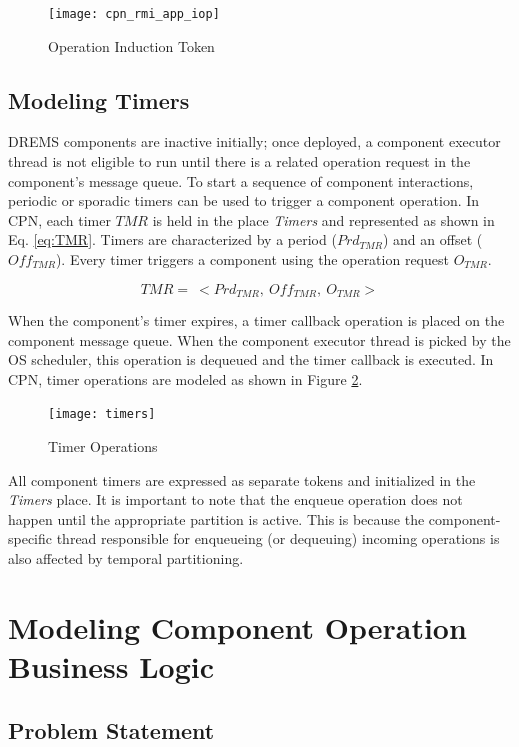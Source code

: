  \begin{figure}[h]
 	\centering
 	\texttt{[image: cpn\_rmi\_app\_iop]}
 	\caption{Operation Induction Token}
 	\label{fig:cpn_rmi_app_iop}
 \end{figure}

\subsection{Modeling Timers}

DREMS components are inactive initially; once deployed, a component executor thread is not eligible to run until there is a related operation request in the component's message queue. To start a sequence of component interactions, periodic or sporadic timers can be used to trigger a component operation. In CPN, each timer $TMR$ is held in the place \emph{Timers} and represented as shown in Eq. \ref{eq:TMR}. Timers are characterized by a period ($Prd_{TMR}$) and an offset ($Off_{TMR}$). Every timer triggers a component using the operation request $O_{TMR}$.

\begin{equation}
\label{eq:TMR}
TMR = \ < Prd_{TMR}, \ Off_{TMR}, \ O_{TMR}>
\end{equation} 

When the component's timer expires, a timer callback operation is placed on the component message queue. When the component executor thread is picked by the OS scheduler, this operation is dequeued and the timer callback is executed. In CPN, timer operations are modeled as shown in Figure \ref{fig:cpn_timers}. 

\begin{figure}[ht]
	\centering
	\texttt{[image: timers]}
	\caption{Timer Operations}
	\label{fig:cpn_timers}
\end{figure}

All component timers are expressed as separate tokens and initialized in the \emph{Timers} place. It is important to note that the enqueue operation does not happen until the appropriate partition is active. This is because the component-specific thread responsible for enqueueing (or dequeuing) incoming operations is also affected by temporal partitioning. 

\section{Modeling Component Operation Business Logic}
\label{sec:BL_Model}

\subsection{Problem Statement}

